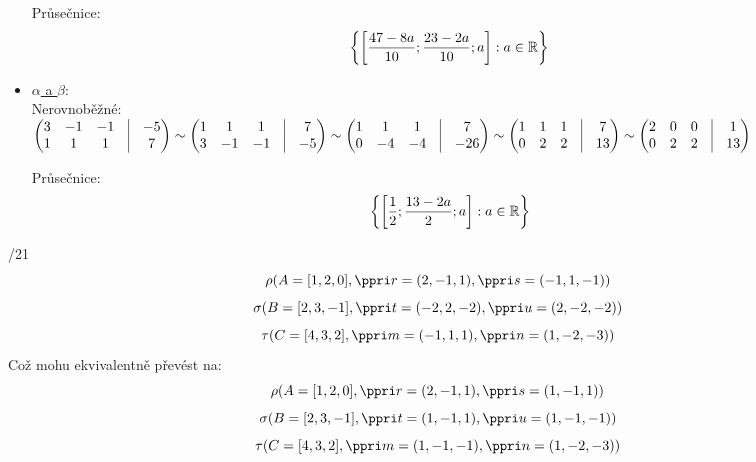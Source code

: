 \begin{itemize}
		Průsečnice:
		$$ 
		 \left\{{\left[{\frac{47-8 a}{10}; \frac{23-2 a}{10}; a}\right]:a \in \mathbb{R}}\right\} 
		  $$ 
	\item \underline{$\alpha$ a $\beta$}: \\
		Nerovnoběžné:\\
		 $ \begin{pmatrix}
			 3 &-1 &-1 &\vline& -5 \\ 
			 1 &1 &1 &\vline& 7 \\ 
		 \end{pmatrix}
		 \sim
		 \begin{pmatrix}
			 1 &1 &1 &\vline& 7 \\ 
			 3 &-1 &-1 &\vline& -5 \\ 
		 \end{pmatrix}
		 \sim
		 \begin{pmatrix}
			 1 &1 &1 &\vline& 7 \\ 
			 0 &-4 &-4 &\vline& -26 \\ 
		 \end{pmatrix}
		 \sim
		 \begin{pmatrix}
			 1 &1 &1 &\vline& 7 \\ 
			 0 &2 &2 &\vline& 13 \\ 
		 \end{pmatrix}
		 \sim
		 \begin{pmatrix}
			 2 &0 &0 &\vline& 1 \\ 
			 0 &2 &2 &\vline& 13 \\ 
		 \end{pmatrix}
		 $


		Průsečnice:
		 $$ 
		  \left\{{\left[{\frac{1}{2}; \frac{13-2 a}{2}; a}\right]:a \in \mathbb{R}}\right\} 
		   $$ 
\end{itemize}
 /21
 $$\rho(A=[1,2,0],\ve r = (2,-1,1),\ve s = (-1,1,-1))$$
 $$\sigma(B=[2,3,-1],\ve t = (-2,2,-2),\ve u = (2,-2,-2))$$
 $$\tau(C=[4,3,2],\ve m = (-1,1,1),\ve n = (1,-2,-3))$$
 Což mohu ekvivalentně převést na:
 $$\rho(A=[1,2,0],\ve r = (2,-1,1),\ve s = (1,-1,1))$$
 $$\sigma(B=[2,3,-1],\ve t = (1,-1,1),\ve u = (1,-1,-1))$$
 $$\tau(C=[4,3,2],\ve m = (1,-1,-1),\ve n = (1,-2,-3))$$

